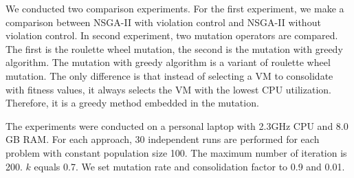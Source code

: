 We conducted two comparison experiments. For the first experiment, we make a comparison between NSGA-II with violation control and NSGA-II without violation control. 
In second experiment, two mutation operators are compared. The first is the roulette wheel mutation, the second is the mutation with greedy algorithm. The mutation with greedy algorithm is a variant of roulette wheel mutation. The only difference is that instead of selecting a VM to consolidate with fitness values, it
always selects the VM with the lowest CPU utilization. 
Therefore, it is a greedy method embedded in the mutation.


The experiments were conducted on a personal laptop with 2.3GHz CPU and 8.0 GB
RAM. For each approach, 30 independent runs are performed for each problem with
constant population size 100. The maximum number of iteration is 200. $k$ equals 0.7. 
We set mutation rate and consolidation factor to 0.9 and 0.01.


